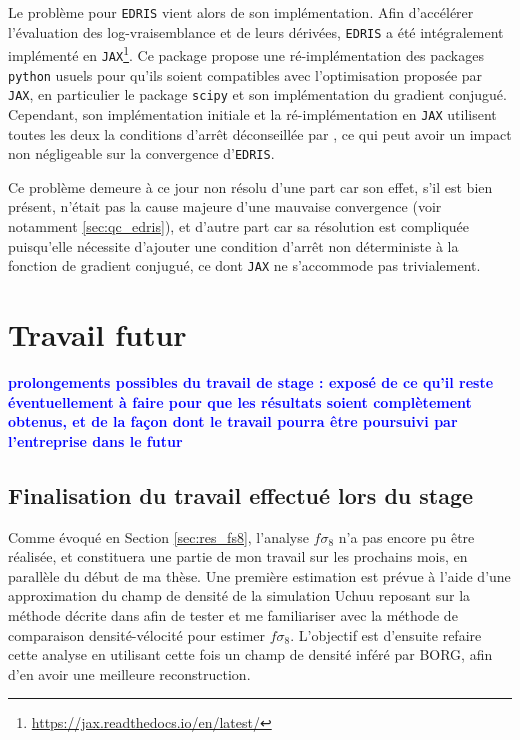 \documentclass{book}
\newcommand{\consignes}[1]{{\textcolor{blue}{\bf \large #1}}}
\def\edris{\texttt{EDRIS}\xspace}
\begin{document}
Le problème pour \edris  vient alors de son implémentation. Afin d'accélérer l'évaluation des log-vraisemblance et de leurs dérivées, \edris a été intégralement implémenté en \texttt{JAX}\footnote{\href{https://jax.readthedocs.io/en/latest/}{https://jax.readthedocs.io/en/latest/}}. Ce package propose une ré-implémentation des packages \texttt{python} usuels pour qu'ils soient compatibles avec l'optimisation proposée par \texttt{JAX}, en particulier le package \texttt{scipy} et son implémentation du gradient conjugué. Cependant, son implémentation initiale et la ré-implémentation en \texttt{JAX} utilisent toutes les deux la conditions d'arrêt déconseillée par \cite{martens_deep_2010}, ce qui peut avoir un impact non négligeable sur la convergence d'\edris.

Ce problème demeure à ce jour non résolu d'une part car son effet, s'il est bien présent, n'était pas la cause majeure d'une mauvaise convergence (voir notamment \ref{sec:qc_edris}), et d'autre part car sa résolution est compliquée puisqu'elle nécessite d'ajouter une condition d'arrêt non déterministe à la fonction de gradient conjugué, ce dont \texttt{JAX} ne s’accommode pas trivialement.


\chapter{Travail futur}
\consignes{prolongements possibles du travail de stage : exposé de ce qu’il reste éventuellement à faire pour que les résultats soient complètement obtenus, et de la façon dont le travail pourra être poursuivi par l’entreprise dans le futur}

\section{Finalisation du travail effectué lors du stage}

Comme évoqué en Section \ref{sec:res_fs8}, l'analyse $f\sigma_8$ n'a pas encore pu être réalisée, et constituera une partie de mon travail sur les prochains mois, en parallèle du début de ma thèse. Une première estimation est prévue à l'aide d'une approximation du champ de densité de la simulation Uchuu reposant sur la méthode décrite dans \cite{carrick_cosmological_2015} afin de tester et me familiariser avec la méthode de comparaison densité-vélocité pour estimer $f\sigma_8$. L'objectif est d'ensuite refaire cette analyse en utilisant cette fois un champ de densité inféré par BORG, afin d'en avoir une meilleure reconstruction.
 
\end{document}
